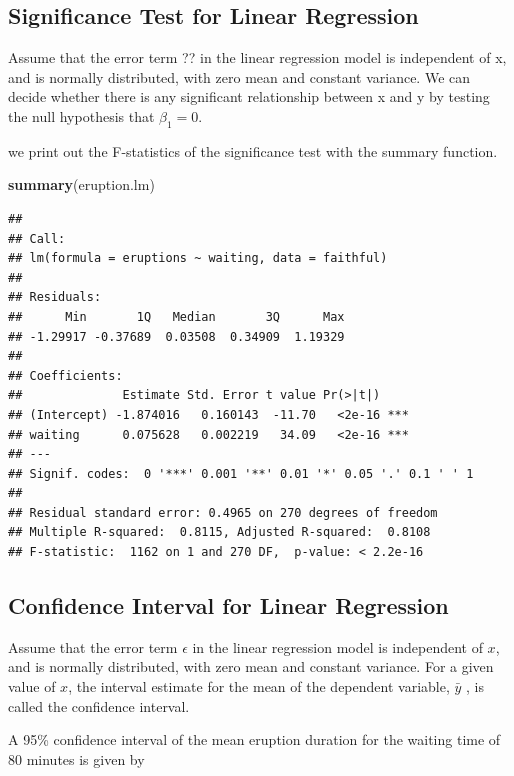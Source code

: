 \documentclass[]{article}
\newenvironment{Shaded}{\begin{snugshade}}{\end{snugshade}}
\newcommand{\KeywordTok}[1]{\textcolor[rgb]{0.13,0.29,0.53}{\textbf{{#1}}}}
\newcommand{\NormalTok}[1]{{#1}}
\numberwithin{equation}{section}
\begin{document}
\subsection{Significance Test for Linear
Regression}\label{significance-test-for-linear-regression}

Assume that the error term ?? in the linear regression model is
independent of x, and is normally distributed, with zero mean and
constant variance. We can decide whether there is any significant
relationship between x and y by testing the null hypothesis that
\(\beta_1 = 0\).

we print out the F-statistics of the significance test with the summary
function.

\begin{Shaded}
\begin{Highlighting}[]
\KeywordTok{summary}\NormalTok{(eruption.lm) }
\end{Highlighting}
\end{Shaded}

\begin{verbatim}
## 
## Call:
## lm(formula = eruptions ~ waiting, data = faithful)
## 
## Residuals:
##      Min       1Q   Median       3Q      Max 
## -1.29917 -0.37689  0.03508  0.34909  1.19329 
## 
## Coefficients:
##              Estimate Std. Error t value Pr(>|t|)    
## (Intercept) -1.874016   0.160143  -11.70   <2e-16 ***
## waiting      0.075628   0.002219   34.09   <2e-16 ***
## ---
## Signif. codes:  0 '***' 0.001 '**' 0.01 '*' 0.05 '.' 0.1 ' ' 1
## 
## Residual standard error: 0.4965 on 270 degrees of freedom
## Multiple R-squared:  0.8115, Adjusted R-squared:  0.8108 
## F-statistic:  1162 on 1 and 270 DF,  p-value: < 2.2e-16
\end{verbatim}

\subsection{Confidence Interval for Linear
Regression}\label{confidence-interval-for-linear-regression}

Assume that the error term \(\epsilon\) in the linear regression model
is independent of \(x\), and is normally distributed, with zero mean and
constant variance. For a given value of \(x\), the interval estimate for
the mean of the dependent variable, \(\bar{y}\) , is called the
confidence interval.

A 95\% confidence interval of the mean eruption duration for the waiting
time of 80 minutes is given by
\end{document}
